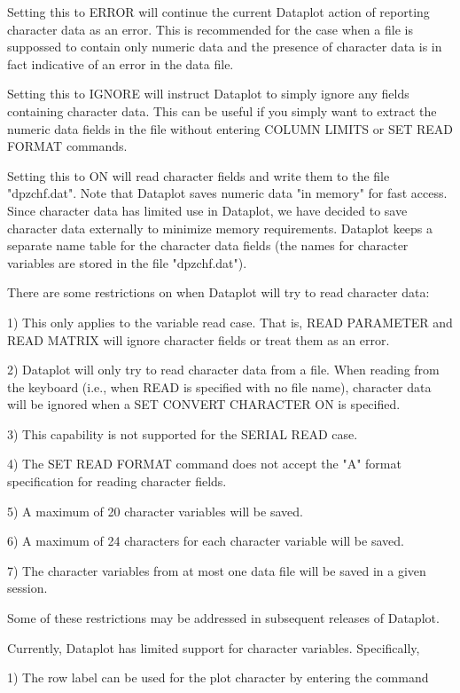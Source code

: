 Setting this to ERROR will continue the current Dataplot action of
reporting character data as an error.  This is recommended for the
case when a file is suppossed to contain only numeric data and the
presence of character data is in fact indicative of an error in the
data file.

Setting this to IGNORE will instruct Dataplot to simply ignore any
fields containing character data.  This can be useful if you simply
want to extract the numeric data fields in the file without
entering COLUMN LIMITS or SET READ FORMAT commands.

Setting this to ON will read character fields and write them to the
file "dpzchf.dat".  Note that Dataplot saves numeric data
"in memory" for fast access.  Since character data has limited
use in Dataplot, we have decided to save character data 
externally to minimize memory requirements.  Dataplot keeps a
separate name table for the character data fields (the names for
character variables are stored in the file "dpzchf.dat").

There are some restrictions on when Dataplot will try to
read character data:

   1) This only applies to the variable read case.  That
      is, READ PARAMETER and READ MATRIX will ignore
      character fields or treat them as an error.

   2) Dataplot will only try to read character data from
      a file.  When reading from the keyboard (i.e., when
      READ is specified with no file name), character data
      will be ignored when a SET CONVERT CHARACTER ON is
      specified.

   3) This capability is not supported for the SERIAL READ
      case.

   4) The SET READ FORMAT command does not accept the
      "A" format specification for reading character
      fields.

   5) A maximum of 20 character variables will be saved.

   6) A maximum of 24 characters for each character variable
      will be saved.

   7) The character variables from at most one data file
      will be saved in a given session.

Some of these restrictions may be addressed in subsequent
releases of Dataplot.

Currently, Dataplot has limited support for character variables.
Specifically,

   1) The row label can be used for the plot character by
      entering the command

